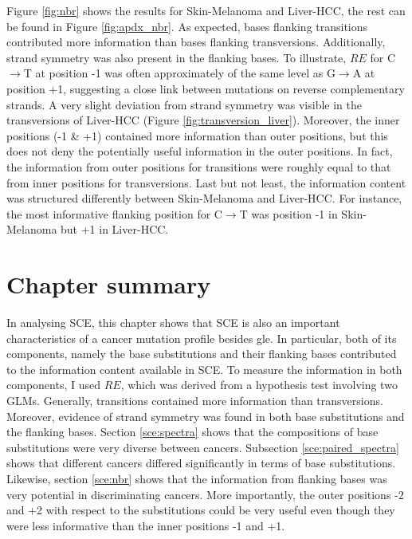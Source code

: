 Figure \ref{fig:nbr} shows the results for Skin-Melanoma and Liver-HCC, the rest can be found in Figure \ref{fig:apdx_nbr}. As expected, bases flanking transitions contributed more information than bases flanking transversions. Additionally, strand symmetry was also present in the flanking bases. To illustrate, $RE$ for C$\rightarrow$T at position -1 was often approximately of the same level as G$\rightarrow$A at position +1, suggesting a close link between mutations on reverse complementary strands. A very slight deviation from strand symmetry was visible in the transversions of Liver-HCC (Figure \ref{fig:transversion_liver}). Moreover, the inner positions (-1 \& +1) contained more information than outer positions, but this does not deny the potentially useful information in the outer positions. In fact, the information from outer positions for transitions were roughly equal to that from inner positions for transversions. Last but not least, the information content was structured differently between Skin-Melanoma and Liver-HCC. For instance, the most informative flanking position for C$\rightarrow$T was position -1 in Skin-Melanoma but +1 in Liver-HCC.


\section{Chapter summary}
In analysing SCE, this chapter shows that SCE is also an important characteristics of a cancer mutation profile besides \gls{gle}. In particular, both of its components, namely the base substitutions and their flanking bases contributed to the information content available in SCE. To measure the information in both components, I used $RE$, which was derived from a hypothesis test involving two GLMs. Generally, transitions contained more information than transversions. Moreover, evidence of strand symmetry was found in both base substitutions and the flanking bases. Section \ref{sce:spectra} shows that the compositions of base substitutions were very diverse between cancers. Subsection \ref{sce:paired_spectra} shows that different cancers differed significantly in terms of base substitutions. Likewise, section \ref{sce:nbr} shows that the information from flanking bases was very potential in discriminating cancers. More importantly, the outer positions -2 and +2 with respect to the substitutions could be very useful even though they were less informative than the inner positions -1 and +1.